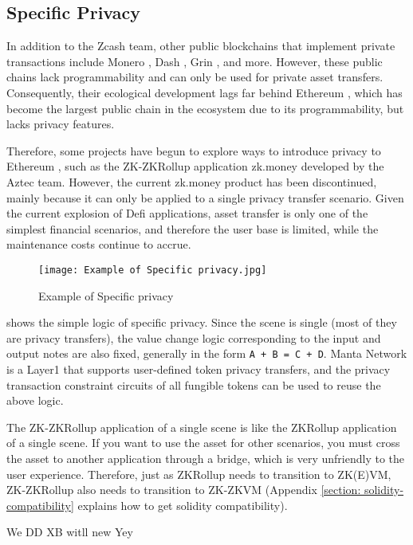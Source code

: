 \subsection{Specific Privacy}

In addition to the Zcash \cite{website:Zcash} team, other public blockchains that implement private transactions include Monero \cite{website:Monero}, Dash \cite{website:Dash}, Grin \cite{website:Grin}, and more. However, these public chains lack programmability and can only be used for private asset transfers. Consequently, their ecological development lags far behind Ethereum \cite{website:Ethereum}, which has become the largest public chain in the ecosystem due to its programmability, but lacks privacy features.

Therefore, some projects have begun to explore ways to introduce privacy to Ethereum \cite{website:Ethereum}, such as the ZK-ZKRollup application zk.money \cite{website:zk.money} developed by the Aztec \cite{website:Aztec} team. However, the current zk.money \cite{website:zk.money} product has been discontinued, mainly because it can only be applied to a single privacy transfer scenario. Given the current explosion of Defi applications, asset transfer is only one of the simplest financial scenarios, and therefore the user base is limited, while the maintenance costs continue to accrue.
\begin{figure}[!ht]
    \centering
    \texttt{[image: Example of Specific privacy.jpg]}
    \caption{Example of Specific privacy}
    \label{fig:Example of Specific privacy}
\end{figure}

 shows the simple logic of specific privacy. Since the scene is single (most of 
they are privacy transfers), the value change logic corresponding to the input and output 
notes are also fixed, generally in the form \verb|A + B = C + D|. Manta Network \cite{website:Manta-network} is a 
Layer1 that supports user-defined token privacy transfers, and the privacy transaction 
constraint circuits of all fungible tokens can be used to reuse the above logic.

The ZK-ZKRollup application of a single scene is like the ZKRollup application of a 
single scene. If you want to use the asset for 
other scenarios, you must cross the asset to another application through a bridge, 
which is very unfriendly to the user experience. Therefore, just as ZKRollup needs to 
transition to ZK(E)VM, ZK-ZKRollup also needs to transition to ZK-ZKVM (Appendix \ref{section: solidity-compatibility} explains 
how to get solidity compatibility).


We DD XB witll new Yey 
